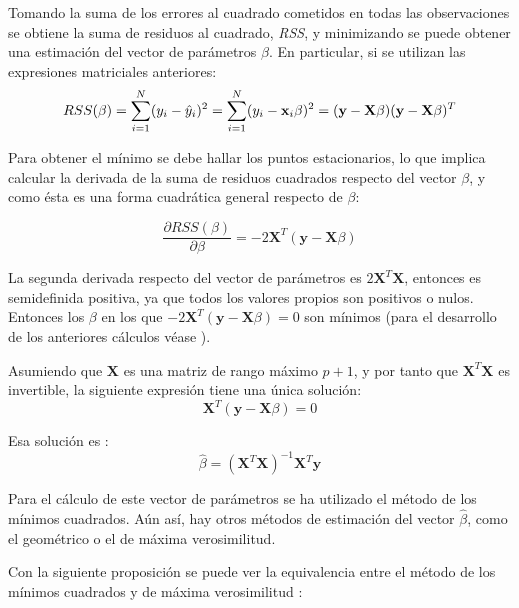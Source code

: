 \noindent Tomando la suma de los errores al cuadrado cometidos  en todas las observaciones se obtiene la suma de residuos al cuadrado, \emph{RSS}, y minimizando se puede obtener una estimación del vector de parámetros $\beta$. En particular, si se utilizan las expresiones matriciales  anteriores:
\begin{equation}
RSS(\beta)=\sum_{i=1}^N(y_i-\hat{y}_i)^2 = \sum_{i=1}^N(y_i-\textbf{x}_i\beta)^2=(\textbf{y}-\textbf{X}\beta)(\textbf{y}-\textbf{X}\beta)^T\\
\end{equation}

\noindent Para obtener el mínimo se debe hallar los puntos estacionarios, lo que implica calcular la derivada de la suma de residuos cuadrados respecto del vector $\beta$, y como ésta es una forma cuadrática general respecto de $\beta$:

\begin{equation}
\dfrac{\partial RSS(\beta)}{\partial \beta}= -2\mathbf{X}^T(\mathbf{y}-\mathbf{X}\beta)
\end{equation}

\noindent La segunda derivada respecto del vector de parámetros es $2\mathbf{X}^T\mathbf{X}$, entonces es  semidefinida positiva, ya que todos los valores propios son positivos o nulos. Entonces los $\beta$ en los que $-2\mathbf{X}^T(\mathbf{y}-\mathbf{X}\beta)=0$ son mínimos (para el desarrollo de los anteriores cálculos véase \cite{Morrison 1976}).  

\noindent Asumiendo que $\textbf{X}$ es una matriz de rango máximo $p+1$, y por tanto que $\mathbf{X}^T \mathbf{X}$ es invertible, la siguiente expresión tiene una única solución: 
\begin{equation}
\textbf{X}^T(\textbf{y}-\textbf{X}\beta)=0
\end{equation}

\noindent Esa solución es :
\begin{equation}
\hat{\beta}=(\textbf{X}^T\textbf{X})^{-1}\textbf{X}^T\textbf{y}
\end{equation}

\noindent Para el cálculo de este vector de parámetros se ha utilizado el método de los mínimos cuadrados. Aún así, hay otros métodos de estimación del vector $\hat{\beta}$, como el geométrico o el de máxima verosimilitud. 

\noindent Con la siguiente proposición se puede ver la equivalencia entre el método de los mínimos cuadrados y  de máxima verosimilitud \cite{Hastie 2001}:

